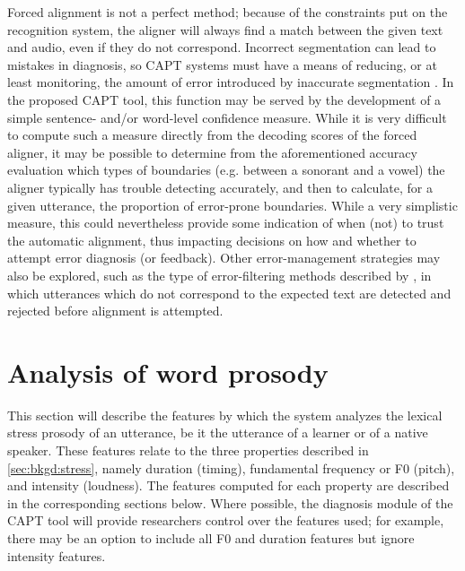 	
	Forced alignment is not a perfect method; because of the constraints put on the recognition system, the aligner will always find a match between the given text and audio, even if they do not correspond. Incorrect segmentation can lead to mistakes in diagnosis, so CAPT systems must have a means of reducing, or at least monitoring, the amount of error introduced by inaccurate segmentation \citep{Eskenazi2009}. 	
	In the proposed CAPT tool, this function may be served by the development of a simple sentence- and/or word-level confidence measure. 
	While it is very difficult to compute such a measure directly from the decoding scores of the forced aligner, it may be possible to determine from the aforementioned accuracy evaluation which types of boundaries (e.g. between a sonorant and a vowel) the aligner typically has trouble detecting accurately, and then to calculate, for a given utterance, the proportion of error-prone boundaries. While a very simplistic measure, this could nevertheless provide some indication of when (not) to trust the automatic alignment, thus impacting decisions on how and whether to attempt error diagnosis (or feedback).
	Other error-management strategies may also be explored, such as the type of error-filtering methods described by \textcite{Mesbahi2011,Bonneau2012,Orosanu2012}, in which utterances which do not correspond to the expected text are detected and rejected before alignment is attempted.
	
\section{Analysis of word prosody}
\label{sec:diag:prosody}

	This section will describe the features by which the system analyzes the lexical stress prosody of an utterance, be it the utterance of a learner or of a native speaker. These features relate to the three properties described in \cref{sec:bkgd:stress}, namely duration (timing), fundamental frequency or F0 (pitch), and intensity (loudness). 
		The features computed for each property are described in the corresponding sections below.
%
	Where possible, the diagnosis module of the CAPT tool will provide researchers control over the features used; for example, there may be an option to include all F0 and duration features but ignore intensity features.
%	


